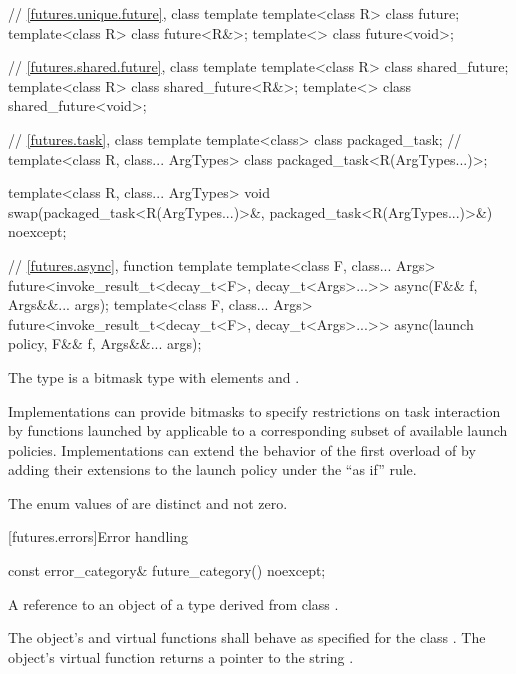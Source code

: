 \begin{codeblock}
{  // \ref{futures.unique.future}, class template 
  template<class R> class future;
  template<class R> class future<R&>;
  template<> class future<void>;

  // \ref{futures.shared.future}, class template 
  template<class R> class shared_future;
  template<class R> class shared_future<R&>;
  template<> class shared_future<void>;

  // \ref{futures.task}, class template 
  template<class> class packaged_task;  // \notdef
  template<class R, class... ArgTypes>
    class packaged_task<R(ArgTypes...)>;

  template<class R, class... ArgTypes>
    void swap(packaged_task<R(ArgTypes...)>&, packaged_task<R(ArgTypes...)>&) noexcept;

  // \ref{futures.async}, function template 
  template<class F, class... Args>
    future<invoke_result_t<decay_t<F>, decay_t<Args>...>>
      async(F&& f, Args&&... args);
  template<class F, class... Args>
    future<invoke_result_t<decay_t<F>, decay_t<Args>...>>
      async(launch policy, F&& f, Args&&... args);
}
\end{codeblock}

\pnum
The  type  is a bitmask type with
elements  and .
\begin{note}
Implementations can provide bitmasks to specify restrictions on task
interaction by functions launched by  applicable to a
corresponding subset of available launch policies. Implementations can extend
the behavior of the first overload of  by adding their extensions
to the launch policy under the ``as if'' rule.
\end{note}

\pnum
The enum values of  are distinct and not zero.

[futures.errors]{Error handling}

%
\begin{itemdecl}
const error_category& future_category() noexcept;
\end{itemdecl}

\begin{itemdescr}
\pnum
\returns
A reference to an object of a type derived from class .

\pnum
The object's  and  virtual functions shall
behave as specified for the class . The object's 
virtual function returns a pointer to the string .
\end{itemdescr}

